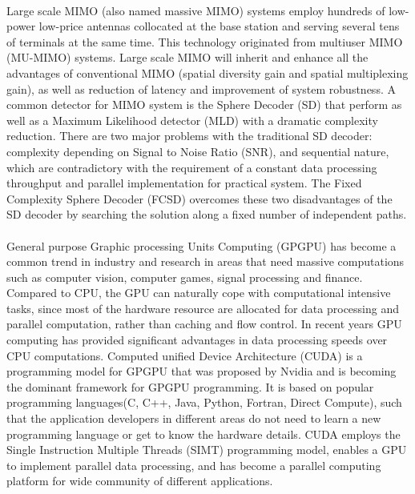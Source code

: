 \documentclass[12pt,a4paper,final]{article}
\begin{document}
\begin{spacing}{2.5}
 \paragraph{} Large scale MIMO (also named massive MIMO) systems employ hundreds of low-power low-price antennas collocated at the base station and serving several tens of terminals at the same time\cite{rusek2013scaling}. This technology originated from multiuser MIMO (MU-MIMO) systems\cite{larsson2013massive}. Large scale MIMO will inherit and enhance all the advantages of conventional MIMO (spatial diversity gain and spatial multiplexing gain), as well as reduction of latency and improvement of system robustness. 
 A common detector for MIMO system is the Sphere Decoder (SD) that perform as well as a Maximum Likelihood detector (MLD) with a dramatic complexity reduction\cite{viterbo1999universal}\cite{hassibi2005sphere}. There are two major problems with the traditional SD decoder: complexity depending on Signal to Noise Ratio (SNR), and sequential nature, which are contradictory with the requirement of a constant data processing throughput and parallel implementation for practical system. The Fixed Complexity Sphere Decoder (FCSD) overcomes these two disadvantages of the SD decoder by searching the solution along a fixed number of independent paths\cite{barbero2008fixing}.
\paragraph{}General purpose Graphic processing Units Computing (GPGPU) has become a common trend in industry and research in areas that need massive computations such as computer vision\cite{fung2008using}, computer games\cite{blewitt2013applicability}, signal processing\cite{van2011accelerating}\cite{6671435} and finance\cite{grauer2013accelerating}. Compared to CPU, the GPU can naturally cope with computational intensive tasks, since most of the hardware resource are allocated for data processing and parallel computation, rather than caching and flow control. In recent years GPU computing has provided significant advantages in data processing speeds over CPU computations\cite{nvidia2008programming}. Computed unified Device Architecture (CUDA) is a programming model for GPGPU that was proposed by Nvidia and is becoming the dominant framework for GPGPU programming. It is based on popular programming languages(C, C++, Java, Python, Fortran, Direct Compute), such that the application developers in different areas do not need to learn a new programming language or get to know the hardware details. CUDA employs the Single Instruction Multiple Threads (SIMT) programming model, enables a GPU to implement parallel data processing, and has become a parallel computing platform for wide community of different applications.

\end{spacing}
\end{document}
